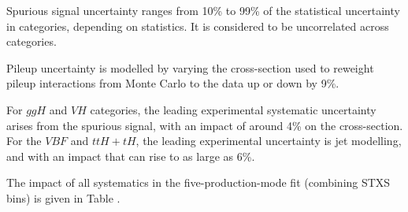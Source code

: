 Spurious signal uncertainty ranges from 10\% to 99\% of the statistical uncertainty in categories, depending on statistics. It is considered to be uncorrelated across categories.

Pileup uncertainty is modelled by varying the cross-section used to reweight pileup interactions from Monte Carlo to the data up or down by 9\%. 

For $ggH$ and $VH$ categories, the leading experimental systematic uncertainty arises from the spurious signal, with an impact of around 4\% on the cross-section. For the $VBF$ and $ttH+tH$, the leading experimental uncertainty is jet modelling, and with an impact that can rise to as large as 6\%.

The impact of all systematics in the five-production-mode fit (combining STXS bins) is given in Table \label{tab:result:systematic}. 

